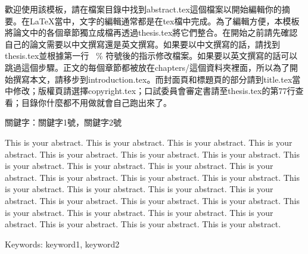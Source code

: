 
\begin{abstractzh}
歡迎使用該模板，請在檔案目錄中找到abstract.tex這個檔案以開始編輯你的摘要。在\LaTeX 當中，文字的編輯通常都是在tex檔中完成。為了編輯方便，本模板將論文中的各個章節獨立成檔再透過thesis.tex將它們整合。在開始之前請先確認自己的論文需要以中文撰寫還是英文撰寫。如果要以中文撰寫的話，請找到thesis.tex並根據第一行 \  \% 符號後的指示修改檔案。如果要以英文撰寫的話可以跳過這個步驟。正文的每個章節都被放在chapters/這個資料夾裡面，所以為了開始撰寫本文，請移步到introduction.tex。而封面頁和標題頁的部分請到title.tex當中修改；版權頁請選擇copyright.tex；口試委員會審定書請至thesis.tex的第77行查看；目錄你什麼都不用做就會自己跑出來了。\\

\vspace{\fill}

\noindent
關鍵字：關鍵字1號，關鍵字2號
\end{abstractzh}



\begin{abstracten}
This is your abstract. This is your abstract. This is your abstract. This is your abstract. This is your abstract. This is your abstract. This is your abstract. This is your abstract. This is your abstract. This is your abstract. This is your abstract. This is your abstract. This is your abstract. This is your abstract. This is your abstract. This is your abstract. This is your abstract. This is your abstract. This is your abstract. This is your abstract. This is your abstract. This is your abstract. This is your abstract. This is your abstract. This is your abstract. This is your abstract. This is your abstract. This is your abstract. \\
\vspace{\fill}

\noindent
Keywords: keyword1, keyword2 
\end{abstracten}
\clearpage